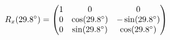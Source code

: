 \documentclass[preview]{standalone}
\begin{document}
\begin{align*}
\special{dvisvgm:raw <g id='unique000'>}R_x(29.8^\circ) = \begin{pmatrix} 1 & 0 & 0 \\ 0 & \cos(29.8^\circ) & -\sin(29.8^\circ) \\ 0 & \sin(29.8^\circ) & \cos(29.8^\circ) \end{pmatrix}\special{dvisvgm:raw </g>}
\end{align*}
\end{document}
